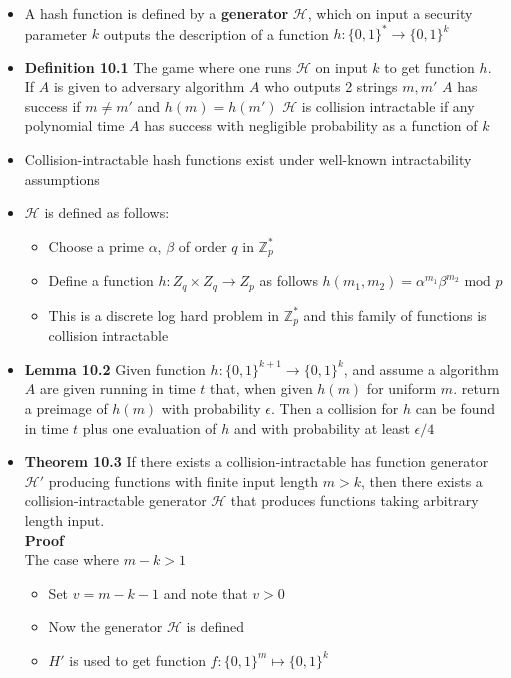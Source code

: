 \begin{itemize}
  \item A hash function is defined by a \textbf{generator} $\mathcal H$, which on input a security parameter $k$ outputs the description of a function $h : \{0,1\}^* \to \{0,1\}^k$
  \item \textbf{Definition 10.1} The game where one runs $\mathcal H$ on input $k$ to get function $h$. If $A$ is given to adversary algorithm $A$ who outputs 2 strings $m,m'$ $A$ has success if $m \neq m'$ and $h(m) = h(m')$ $\mathcal H$ is collision intractable if any polynomial time $A$ has success with negligible probability as a function of $k$
  \item Collision-intractable hash functions exist under well-known intractability assumptions
  \item $\mathcal H$ is defined as follows:
  \begin{itemize}
  	\item Choose a prime $\alpha$, $\beta$ of order $q$ in $\mathbb Z_p^*$
  	\item Define a function $h : Z_q \times Z_q \to Z_p$ as follows $h(m_1, m_2) = \alpha^{m_1} \beta^{m_2} \text{ mod } p$
  	\item This is a discrete log hard problem in $\mathbb Z_p^*$ and this family of functions is collision intractable
  \end{itemize}
  \item \textbf{Lemma 10.2} Given function $h : \{0,1\}^{k+1} \to \{0,1\}^k$, and assume a algorithm $A$ are given running in time $t$ that, when given $h(m)$ for uniform $m$. return a preimage of $h(m)$ with probability $\epsilon$. Then a collision for $h$ can be found in time $t$ plus one evaluation of $h$ and with probability at least $\epsilon/4$
  \item \textbf{Theorem 10.3} If there exists a collision-intractable has function generator $\mathcal H'$ producing functions with finite input length $m >k$, then there exists a collision-intractable generator $\mathcal H$ that produces functions taking arbitrary length input. \smallskip \\
  \textbf{Proof} \\
  The case where $m-k > 1$ 
  \begin{itemize}
    \item Set $v = m-k-1$ and note that $v> 0$ 
    \item Now the generator $\mathcal H$ is defined
    \item $H'$ is used to get function $f: \{0,1\}^m \mapsto \{0,1\}^k$ 

\end{itemize}
\end{itemize}
